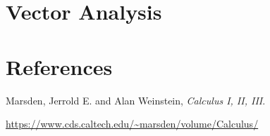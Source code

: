 \documentclass[11pt]{article}
\begin{document}
\section{Vector Analysis}

















































































\newpage
\section{References}

Marsden, Jerrold E. and Alan Weinstein,
\textit{Calculus I, II, III}.

\noindent\url{https://www.cds.caltech.edu/~marsden/volume/Calculus/}
\end{document}
